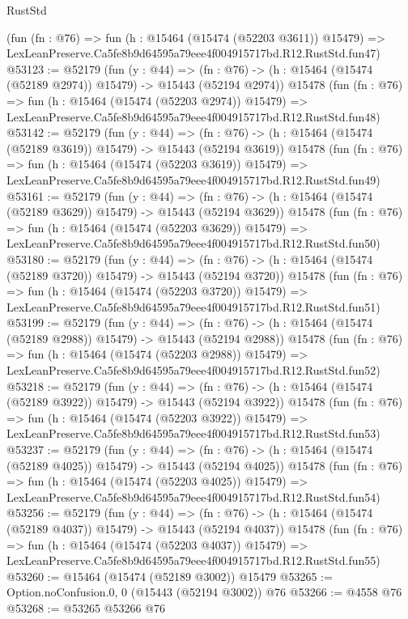\begin{lexlean}{RustStd}
\begin{coremodule}
    (fun (fn : @76) =>
    fun (h : @15464 (@15474 (@52203 @3611)) @15479) =>
    LexLeanPreserve.Ca5fe8b9d64595a79eee4f004915717bd.R12.RustStd.fun47)
@53123 := @52179
    (fun (y : @44) =>
    (fn : @76) -> (h : @15464 (@15474 (@52189 @2974)) @15479) -> @15443 (@52194 @2974))
    @15478
    (fun (fn : @76) =>
    fun (h : @15464 (@15474 (@52203 @2974)) @15479) =>
    LexLeanPreserve.Ca5fe8b9d64595a79eee4f004915717bd.R12.RustStd.fun48)
@53142 := @52179
    (fun (y : @44) =>
    (fn : @76) -> (h : @15464 (@15474 (@52189 @3619)) @15479) -> @15443 (@52194 @3619))
    @15478
    (fun (fn : @76) =>
    fun (h : @15464 (@15474 (@52203 @3619)) @15479) =>
    LexLeanPreserve.Ca5fe8b9d64595a79eee4f004915717bd.R12.RustStd.fun49)
@53161 := @52179
    (fun (y : @44) =>
    (fn : @76) -> (h : @15464 (@15474 (@52189 @3629)) @15479) -> @15443 (@52194 @3629))
    @15478
    (fun (fn : @76) =>
    fun (h : @15464 (@15474 (@52203 @3629)) @15479) =>
    LexLeanPreserve.Ca5fe8b9d64595a79eee4f004915717bd.R12.RustStd.fun50)
@53180 := @52179
    (fun (y : @44) =>
    (fn : @76) -> (h : @15464 (@15474 (@52189 @3720)) @15479) -> @15443 (@52194 @3720))
    @15478
    (fun (fn : @76) =>
    fun (h : @15464 (@15474 (@52203 @3720)) @15479) =>
    LexLeanPreserve.Ca5fe8b9d64595a79eee4f004915717bd.R12.RustStd.fun51)
@53199 := @52179
    (fun (y : @44) =>
    (fn : @76) -> (h : @15464 (@15474 (@52189 @2988)) @15479) -> @15443 (@52194 @2988))
    @15478
    (fun (fn : @76) =>
    fun (h : @15464 (@15474 (@52203 @2988)) @15479) =>
    LexLeanPreserve.Ca5fe8b9d64595a79eee4f004915717bd.R12.RustStd.fun52)
@53218 := @52179
    (fun (y : @44) =>
    (fn : @76) -> (h : @15464 (@15474 (@52189 @3922)) @15479) -> @15443 (@52194 @3922))
    @15478
    (fun (fn : @76) =>
    fun (h : @15464 (@15474 (@52203 @3922)) @15479) =>
    LexLeanPreserve.Ca5fe8b9d64595a79eee4f004915717bd.R12.RustStd.fun53)
@53237 := @52179
    (fun (y : @44) =>
    (fn : @76) -> (h : @15464 (@15474 (@52189 @4025)) @15479) -> @15443 (@52194 @4025))
    @15478
    (fun (fn : @76) =>
    fun (h : @15464 (@15474 (@52203 @4025)) @15479) =>
    LexLeanPreserve.Ca5fe8b9d64595a79eee4f004915717bd.R12.RustStd.fun54)
@53256 := @52179
    (fun (y : @44) =>
    (fn : @76) -> (h : @15464 (@15474 (@52189 @4037)) @15479) -> @15443 (@52194 @4037))
    @15478
    (fun (fn : @76) =>
    fun (h : @15464 (@15474 (@52203 @4037)) @15479) =>
    LexLeanPreserve.Ca5fe8b9d64595a79eee4f004915717bd.R12.RustStd.fun55)
@53260 := @15464 (@15474 (@52189 @3002)) @15479
@53265 := Option.noConfusion.{0, 0} (@15443 (@52194 @3002)) @76
@53266 := @4558 @76
@53268 := @53265 @53266 @76

\end{coremodule}
\end{lexlean}
